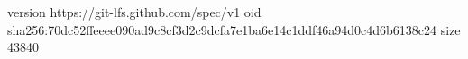 version https://git-lfs.github.com/spec/v1
oid sha256:70dc52ffeeee090ad9c8cf3d2c9dcfa7e1ba6e14c1ddf46a94d0c4d6b6138c24
size 43840

